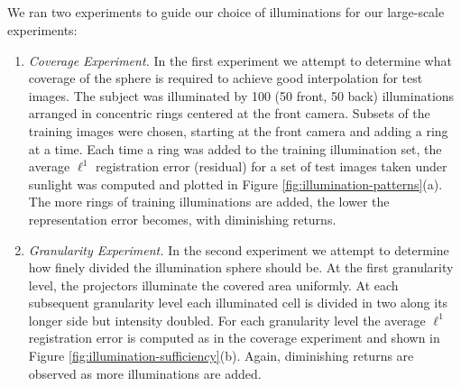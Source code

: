 \documentclass[12pt,journal,draftcls,letterpaper,onecolumn]{IEEEtran}
\providecommand{\DIFadd}[1]{{\protect\color{blue}\uwave{#1}}} %
\providecommand{\DIFaddbegin}{} %
\providecommand{\DIFaddend}{} %
\providecommand{\DIFdelbegin}{} %
\providecommand{\DIFdelend}{} %
\begin{document}
\subsection{\DIFadd{Choice of Illumination Patterns}}

\DIFaddend We ran two experiments to guide our choice of illuminations for
our large-scale experiments:
\DIFdelbegin %
\DIFdelend \DIFaddbegin \begin{enumerate}
\DIFaddend \item {\em Coverage Experiment.} In the first experiment we
    attempt to determine what coverage of the sphere is
    required to achieve good interpolation for test images.
    The subject was illuminated by 100 (50 front, 50 back)
    illuminations arranged in concentric rings centered at
    the front camera.  Subsets of the training images were
    chosen, starting at the front camera and adding a ring
    at a time.  Each time a ring was added to the training
    illumination set, the average $\ell^1$ registration
    error (residual) for a set of test images taken under
    sunlight was computed and plotted in Figure
    \ref{fig:illumination-patterns}(a).  The more rings of
    training illuminations are added, the lower the
    representation error becomes, with diminishing returns.
\item {\em Granularity Experiment.} In the second
    experiment we attempt to determine how finely divided
    the illumination sphere should be.  At the first
    granularity level, the projectors  illuminate the
    covered area uniformly.  At each subsequent granularity
    level each illuminated cell is divided in two along its
    longer side but intensity doubled.  For each
    granularity level the average $\ell^1$ registration
    error is computed as in the coverage experiment and
    shown in Figure \ref{fig:illumination-sufficiency}(b).
    Again, diminishing returns are observed as more
    illuminations are added.
\DIFdelbegin %
\DIFdelend \DIFaddbegin \end{enumerate}
\end{document}
